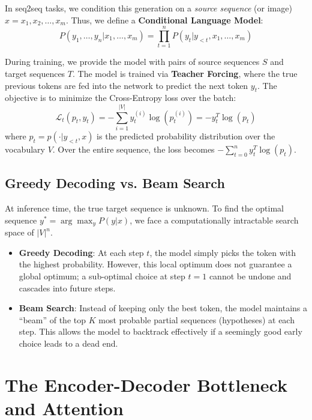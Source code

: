 In seq2seq tasks, we condition this generation on a \textit{source sequence} (or image) $x = x_1, x_2, \dots, x_m$. Thus, we define a \textbf{Conditional Language Model}:
\begin{equation}
    P(y_1, \dots, y_n | x_1, \dots, x_m) = \prod_{t=1}^n P(y_t | y_{<t}, x_1, \dots, x_m)
\end{equation}

During training, we provide the model with pairs of source sequences $S$ and target sequences $T$. The model is trained via \textbf{Teacher Forcing}, where the true previous tokens are fed into the network to predict the next token $y_t$. The objective is to minimize the Cross-Entropy loss over the batch:
\begin{equation}
    \mathcal{L}_t(p_t, y_t) = -\sum_{i=1}^{|V|} y_t^{(i)} \log(p_t^{(i)}) = -y_t^T \log(p_t)
\end{equation}
where $p_t = p(\cdot | y_{<t}, x)$ is the predicted probability distribution over the vocabulary $V$. Over the entire sequence, the loss becomes $-\sum_{t=0}^n y_t^T \log(p_t)$.

\subsection{Greedy Decoding vs. Beam Search}
At inference time, the true target sequence is unknown. To find the optimal sequence $y^* = \arg\max_y P(y|x)$, we face a computationally intractable search space of $|V|^n$.

\begin{itemize}
    \item \textbf{Greedy Decoding}: At each step $t$, the model simply picks the token with the highest probability. However, this local optimum does not guarantee a global optimum; a sub-optimal choice at step $t=1$ cannot be undone and cascades into future steps.
    \item \textbf{Beam Search}: Instead of keeping only the best token, the model maintains a ``beam'' of the top $K$ most probable partial sequences (hypotheses) at each step. This allows the model to backtrack effectively if a seemingly good early choice leads to a dead end.
\end{itemize}

\section{The Encoder-Decoder Bottleneck and Attention}
\label{sec:attention}

